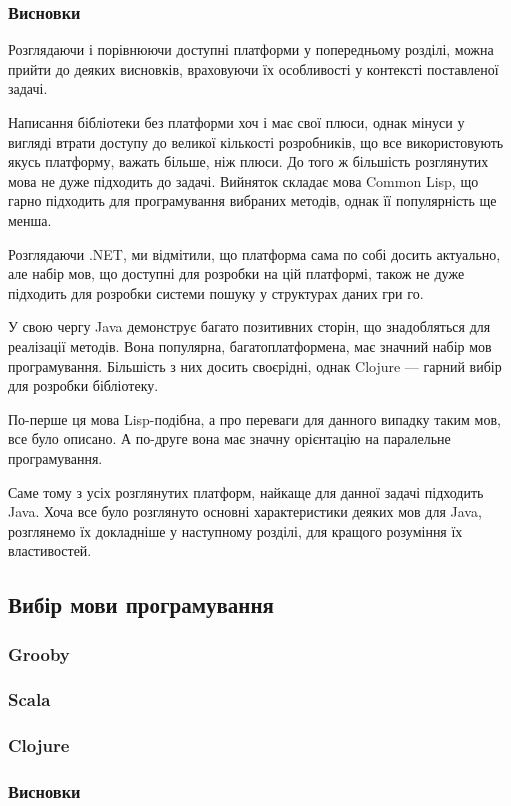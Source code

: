 \subsubsection{Висновки}
Розглядаючи і порівнюючи доступні платформи у попередньому розділі, можна прийти до деяких висновків, враховуючи їх особливості у контексті поставленої задачі.

Написання бібліотеки без платформи хоч і має свої плюси, однак мінуси у вигляді втрати доступу до великої кількості розробників, що все використовують якусь платформу, важать більше, ніж плюси. До того ж більшість розглянутих мова не дуже підходить до задачі. Вийняток складає мова Common Lisp, що гарно підходить для програмування вибраних методів, однак її популярність ще менша.

Розглядаючи .NET, ми відмітили, що платформа сама по собі досить актуально, але набір мов, що доступні для розробки на цій платформі, також не дуже підходить для розробки системи пошуку у структурах даних гри го.

У свою чергу Java демонструє багато позитивних сторін, що знадобляться для реалізації методів. Вона популярна, багатоплатформена, має значний набір мов програмування. Більшість з них досить своєрідні, однак Clojure --- гарний вибір для розробки бібліотеку.

По-перше ця мова Lisp-подібна, а про переваги для данного випадку таким мов, все було описано. А по-друге вона має значну орієнтацію на паралельне програмування.

Саме тому з усіх розглянутих платформ, найкаще для данної задачі підходить Java. Хоча все було розглянуто основні характеристики деяких мов для Java, розглянемо їх докладніше у наступному розділі, для кращого розуміння їх властивостей.
\subsection{Вибір мови програмування}
\subsubsection{Grooby}
\subsubsection{Scala}
\subsubsection{Clojure}
\subsubsection{Висновки}